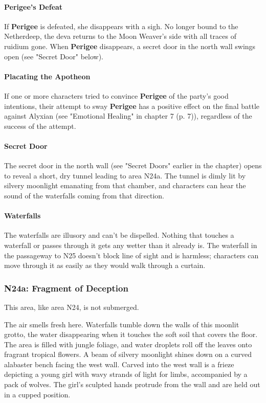 \documentclass[letterpaper, 11pt, bg=full, twocolumn]{dndbook}
\begin{document}
\paragraph{Perigee's Defeat}

If \textbf{Perigee} is defeated, she disappears with a sigh. No longer bound to the Netherdeep, the deva returns to the Moon Weaver's side with all traces of ruidium gone. When \textbf{Perigee} disappears, a secret door in the north wall swings open (see "Secret Door" below).

\paragraph{Placating the Apotheon}

If one or more characters tried to convince \textbf{Perigee} of the party's good intentions, their attempt to sway \textbf{Perigee} has a positive effect on the final battle against Alyxian (see "Emotional Healing" in chapter 7 (p. 7)), regardless of the success of the attempt.

\paragraph{Secret Door}

The secret door in the north wall (see "Secret Doors" earlier in the chapter) opens to reveal a short, dry tunnel leading to area N24a. The tunnel is dimly lit by silvery moonlight emanating from that chamber, and characters can hear the sound of the waterfalls coming from that direction.

\paragraph{Waterfalls}

The waterfalls are illusory and can't be dispelled. Nothing that touches a waterfall or passes through it gets any wetter than it already is. The waterfall in the passageway to N25 doesn't block line of sight and is harmless; characters can move through it as easily as they would walk through a curtain.

\subsubsection{N24a: Fragment of Deception}

This area, like area N24, is not submerged.

\begin{DndReadAloud}
The air smells fresh here. Waterfalls tumble down the walls of this moonlit grotto, the water disappearing when it touches the soft soil that covers the floor. The area is filled with jungle foliage, and water droplets roll off the leaves onto fragrant tropical flowers.
A beam of silvery moonlight shines down on a curved alabaster bench facing the west wall. Carved into the west wall is a frieze depicting a young girl with wavy strands of light for limbs, accompanied by a pack of wolves. The girl's sculpted hands protrude from the wall and are held out in a cupped position.
\end{DndReadAloud}
\end{document}
